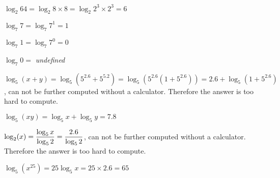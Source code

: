 \documentclass[12pt]{exam}
\begin{document}
\begin{solution}

\begin{qparts}
\item$ \log_2{64} = \log_2{8 \times 8} = \log_2{2^3 \times 2^3} =  6$
\item $\log_7{7} = \log_7{7^1} = 1$ 
\item $\log_7{1} = \log_7{7^0} = 0$
\item $\log_7{0} = $ \emph{undefined} 
\item $\log_5(x+y) = \log_5{(5^{2.6} + 5^{5.2})} = \log_5{(5^{2.6}(1+5^{2.6}))} = 2.6 + \log_5{(1+5^{2.6})} $, can not be further computed without a calculator. Therefore the answer is too hard to compute.
\item $\log_5(xy) = \log_5{x} + \log_5{y} = 7.8$
\item $\log_2(x) = \displaystyle{{\log_5{x}}\over{\log_5{2}}} ={{2.6}\over{\log_5{2}}}$, can not be further computed without a calculator. Therefore the answer is too hard to compute.
\item $\log_5(x^{25}) = 25\log_5{x} = 25 \times 2.6 =65$
\end{qparts}

\end{solution}
\end{document}
